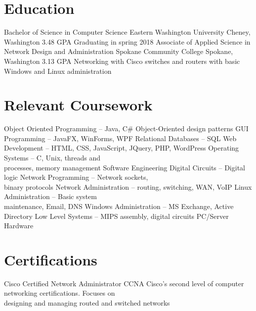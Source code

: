 \documentclass[11pt,letterpaper,sans]{moderncv}
\begin{document}
\makecvtitle{}


\section{Education}
	{Bachelor of Science in Computer Science}
	{Eastern Washington University}
	{Cheney, Washington}
	{3.48 GPA}
	{Graduating in spring 2018}
	{Associate of Applied Science in Network Design and Administration}
	{Spokane Community College}
	{Spokane, Washington}
	{3.13 GPA}
	{Networking with Cisco switches and routers with basic Windows and Linux
	administration}


\section{Relevant Coursework}
\cvlistdoubleitem %
	{Object Oriented Programming -- Java, C\#} %
	{Object-Oriented design patterns}
\cvlistdoubleitem %
	{GUI Programming -- JavaFX, WinForms, WPF} %
	{Relational Databases -- SQL} %
\cvlistdoubleitem %
	{Web Development -- HTML, CSS, JavaScript, JQuery, PHP, WordPress} %
	{Operating Systems -- C, Unix, threads and\\ processes, memory management} %
\cvlistdoubleitem %
	{Software Engineering} %
	{Digital Circuits -- Digital logic} %
\cvlistdoubleitem %
	{Network Programming -- Network sockets,\\ binary protocols} %
	{Network Administration -- routing, switching, WAN, VoIP} %
\cvlistdoubleitem %
	{Linux Administration -- Basic system\\ maintenance, Email, DNS} %
	{Windows Administration -- MS Exchange, Active Directory} %
\cvlistdoubleitem %
	{Low Level Systems -- MIPS assembly, digital circuits} %
	{PC/Server Hardware}


\section{Certifications}
	{Cisco Certified Network Administrator}
	{CCNA}
	{}
	{}
	{Cisco's second level of computer networking certifications. Focuses on\\
	designing and managing routed and switched networks}



\clearpage

\end{document}

